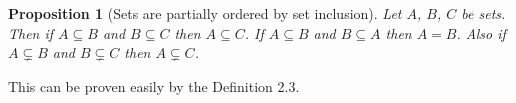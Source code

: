 \documentclass[12pt]{article}
\newtheorem{proposition}{Proposition}[section]
\theoremstyle{remark}
\begin{document}

\begin{proposition}[Sets are partially ordered by set inclusion]
    Let $ A $, $ B $, $ C $ be sets. Then if $ A \subseteq B $ and $ B \subseteq C $ then $ A \subseteq C $. If $ A \subseteq B $ and $ B \subseteq A $ then $ A = B $. Also if $ A \subsetneq B $ and $ B \subsetneq C $ then $ A \subsetneq C $.
\end{proposition}

This can be proven easily by the Definition 2.3.
\end{document}
